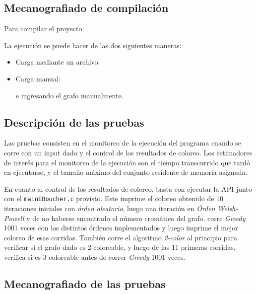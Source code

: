 \documentclass[11pt,a4paper]{article}
\theoremstyle{plain}
\begin{document}
	\subsection{Mecanografiado de compilación}

Para compilar el proyecto:
\begin{quote}
\end{quote}

La ejecución se puede hacer de las dos siguientes maneras:
\begin{itemize}
\item{Carga mediante un archivo:
\begin{quote}
\end{quote}}

\item{Carga manual:
\begin{quote}
\end{quote}
 e ingresando el grafo manualmente.
}
\end{itemize}
	
	\subsection{Descripción de las pruebas}
	
Las pruebas consisten en el monitoreo de la ejecución del programa cuando se corre con un input dado y el control de los resultados de coloreo. Los estimadores de interés para el monitoreo de la ejecución son el tiempo transcurrido que tardó en ejecutarse, y el tamaño máximo del conjunto residente de memoria asignada.

En cuanto al control de los resultados de coloreo, basta con ejecutar la API junto con el \texttt{mainEBoucher.c} provisto. Este imprime el coloreo obtenido de 10 iteraciones iniciales con \emph{órden aleatorio}, luego una iteración en \emph{Órden Welsh-Powell} y de no haberse encontrado el número cromático del grafo, corre \emph{Greedy} 1001 veces con los distintos órdenes implementados y luego imprime el mejor coloreo de esas corridas. También corre el algoritmo \emph{2-color} al principio para verificar si el grafo dado es 2-coloreable, y luego de las 11 primeras corridas, verifica si es 3-coloreable antes de correr \emph{Greedy} 1001 veces.
	
	\subsection{Mecanografiado de las pruebas}
\end{document}
